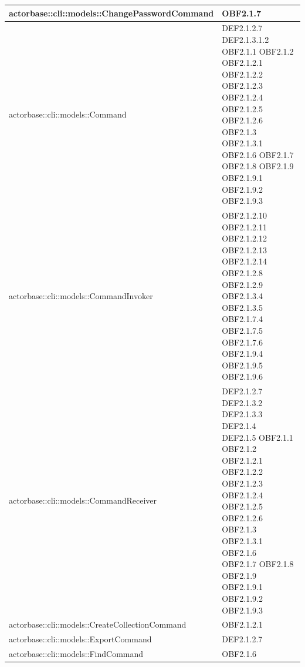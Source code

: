 \documentclass{scalatekids-article}
\begin{document}
\begin{longtable}[H]{|p{12cm}|p{5.5cm}|}
\hline
actorbase::cli::models::ChangePasswordCommand & \multiLineCell[t]{OBF2.1.7\\}\\
\hline
actorbase::cli::models::Command & \multiLineCell[t]{DEF2.1.2.7 DEF2.1.3.1.2\\OBF2.1.1 OBF2.1.2\\OBF2.1.2.1 OBF2.1.2.2\\OBF2.1.2.3 OBF2.1.2.4\\OBF2.1.2.5 OBF2.1.2.6\\OBF2.1.3 OBF2.1.3.1\\OBF2.1.6 OBF2.1.7\\OBF2.1.8 OBF2.1.9\\OBF2.1.9.1 OBF2.1.9.2\\OBF2.1.9.3}\\
\hline
actorbase::cli::models::CommandInvoker & \multiLineCell[t]{OBF2.1.2.10 OBF2.1.2.11\\OBF2.1.2.12 OBF2.1.2.13\\OBF2.1.2.14 OBF2.1.2.8\\OBF2.1.2.9 OBF2.1.3.4\\OBF2.1.3.5 OBF2.1.7.4\\OBF2.1.7.5 OBF2.1.7.6\\OBF2.1.9.4 OBF2.1.9.5\\OBF2.1.9.6}\\
\hline
actorbase::cli::models::CommandReceiver & \multiLineCell[t]{DEF2.1.2.7 DEF2.1.3.2\\DEF2.1.3.3 DEF2.1.4\\DEF2.1.5 OBF2.1.1\\OBF2.1.2 OBF2.1.2.1\\OBF2.1.2.2 OBF2.1.2.3\\OBF2.1.2.4 OBF2.1.2.5\\OBF2.1.2.6 OBF2.1.3\\OBF2.1.3.1 OBF2.1.6\\OBF2.1.7 OBF2.1.8\\OBF2.1.9 OBF2.1.9.1\\OBF2.1.9.2 OBF2.1.9.3\\}\\
\hline
actorbase::cli::models::CreateCollectionCommand & \multiLineCell[t]{OBF2.1.2.1\\}\\
\hline
actorbase::cli::models::ExportCommand & \multiLineCell[t]{DEF2.1.2.7\\}\\
\hline
actorbase::cli::models::FindCommand & \multiLineCell[t]{OBF2.1.6\\}\\

\end{longtable}
\end{document}
